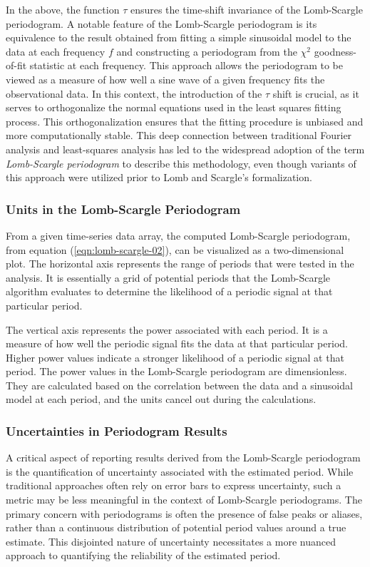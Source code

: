     			In the above, the function $\tau$ ensures the time-shift invariance of the Lomb-Scargle periodogram. A notable feature of the Lomb-Scargle periodogram is its equivalence to the result obtained from fitting a simple sinusoidal model to the data at each frequency $f$ and constructing a periodogram from the $\chi^2$ goodness-of-fit statistic at each frequency. This approach allows the periodogram to be viewed as a measure of how well a sine wave of a given frequency fits the observational data. In this context, the introduction of the $\tau$ shift is crucial, as it serves to orthogonalize the normal equations used in the least squares fitting process. This orthogonalization ensures that the fitting procedure is unbiased and more computationally stable. This deep connection between traditional Fourier analysis and least-squares analysis has led to the widespread adoption of the term \textit{Lomb-Scargle periodogram} to describe this methodology, even though variants of this approach were utilized prior to Lomb and Scargle's formalization.
    			
    		\subsubsection{Units in the Lomb-Scargle Periodogram}
    			From a given time-series data array, the computed Lomb-Scargle periodogram, from equation (\ref{eqn:lomb-scargle-02}), can be visualized as a two-dimensional plot. The horizontal axis represents the range of periods that were tested in the analysis. It is essentially a grid of potential periods that the Lomb-Scargle algorithm evaluates to determine the likelihood of a periodic signal at that particular period.
    			
    			The vertical axis represents the power associated with each period. It is a measure of how well the periodic signal fits the data at that particular period. Higher power values indicate a stronger likelihood of a periodic signal at that period. The power values in the Lomb-Scargle periodogram are dimensionless. They are calculated based on the correlation between the data and a sinusoidal model at each period, and the units cancel out during the calculations.
    			
    		\subsubsection{Uncertainties in Periodogram Results}
    			A critical aspect of reporting results derived from the Lomb-Scargle periodogram is the quantification of uncertainty associated with the estimated period. While traditional approaches often rely on error bars to express uncertainty, such a metric may be less meaningful in the context of Lomb-Scargle periodograms. The primary concern with periodograms is often the presence of false peaks or aliases, rather than a continuous distribution of potential period values around a true estimate. This disjointed nature of uncertainty necessitates a more nuanced approach to quantifying the reliability of the estimated period.
    			
